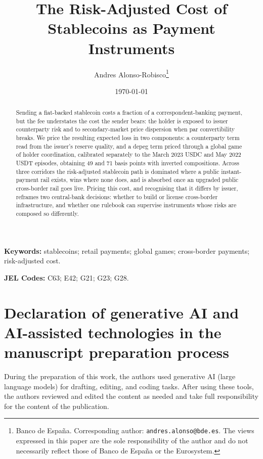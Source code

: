 \documentclass[12pt]{article}
\title{The Risk-Adjusted Cost of Stablecoins as Payment Instruments}
\author{
Andres Alonso-Robisco\thanks{Banco de Espa\~na.
Corresponding author: \texttt{andres.alonso@bde.es}.
The views expressed in this paper are the sole responsibility of the
author and do not necessarily reflect those of Banco de Espa\~na or
the Eurosystem.}
}
\date{\today}
\begin{document}
\maketitle
\doublespacing

\vspace{0.5em}
\begin{abstract}
\noindent Sending a fiat-backed stablecoin costs a fraction of a correspondent-banking payment, but the fee understates the cost the sender bears: the holder is exposed to issuer counterparty risk and to secondary-market price dispersion when par convertibility breaks. We price the resulting expected loss in two components: a counterparty term read from the issuer's reserve quality, and a depeg term priced through a global game of holder coordination, calibrated separately to the March 2023 USDC and May 2022 USDT episodes, obtaining 49 and 71 basis points with inverted compositions. Across three corridors the risk-adjusted stablecoin path is dominated where a public instant-payment rail exists, wins where none does, and is absorbed once an upgraded public cross-border rail goes live. Pricing this cost, and recognising that it differs by issuer, reframes two central-bank decisions: whether to build or license cross-border infrastructure, and whether one rulebook can supervise instruments whose risks are composed so differently.
\end{abstract}

\vspace{2em}

\noindent\textbf{Keywords:} stablecoins; retail payments; global games; cross-border payments; risk-adjusted cost.

\medskip
\noindent\textbf{JEL Codes:} C63; E42; G21; G23; G28.

\clearpage











\clearpage
\section*{Declaration of generative AI and AI-assisted technologies in the manuscript preparation process}

During the preparation of this work, the authors used generative AI (large language models) for drafting, editing, and coding tasks. After using these tools, the authors reviewed and edited the content as needed and take full responsibility for the content of the publication.

\clearpage
\begingroup
\singlespacing


\endgroup

\clearpage
\appendix




\end{document}
